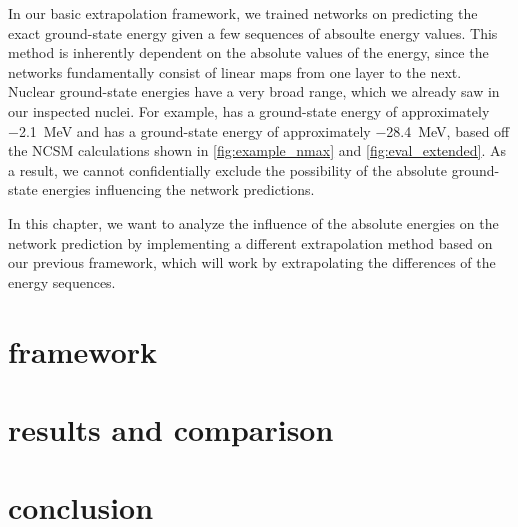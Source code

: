 In our basic extrapolation framework, we trained networks on predicting the exact ground-state energy given a few sequences of absoulte energy values. This method is inherently dependent on the absolute values of the energy, since the networks fundamentally consist of linear maps from one layer to the next. Nuclear ground-state energies have a very broad range, which we already saw in our inspected nuclei. For example,  has a ground-state energy of approximately \SI{-2.1}{\mega\electronvolt} and  has a ground-state energy of approximately \SI{-28.4}{\mega\electronvolt}, based off the NCSM calculations shown in \autoref{fig:example_nmax} and \autoref{fig:eval_extended}. As a result, we cannot confidentially exclude the possibility of the absolute ground-state energies influencing the network predictions.

In this chapter, we want to analyze the influence of the absolute energies on the network prediction by implementing a different extrapolation method based on our previous framework, which will work by extrapolating the differences of the energy sequences.
\section{framework}

\section{results and comparison}

\section{conclusion}

